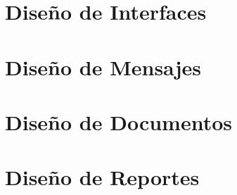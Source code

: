 \documentclass[10pt]{book}
\begin{document}
	
	\chapter{Diseño de Interfaces}
	\label{chapter:interfaces}
	
	\chapter{Diseño de Mensajes}
	\label{chapter:msgs}
	
	\chapter{Diseño de Documentos}
	\label{chapter:docs}
	
	
	\chapter{Diseño de Reportes}
	\label{chater:reportes}
	
	
	



%	
%	

    \appendix

    \clossing
	\cdtSaveData    
\end{document}
